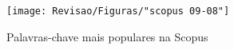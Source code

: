 \begin{figure}[!htb]
	\centering
	\caption{Palavras-chave mais populares na Scopus}
	\label{fig:scopus-09-08}
	\texttt{[image: Revisao/Figuras/"scopus 09-08"]}
	
\end{figure}